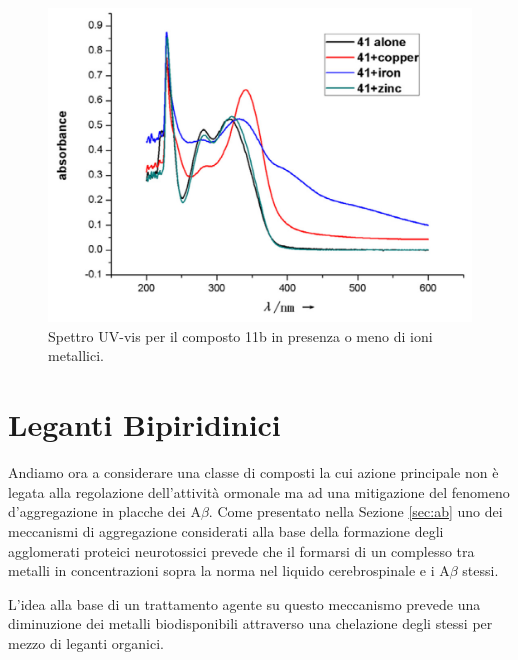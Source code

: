 \documentclass[a4paper, 12pt]{article}
\begin{document}
\begin{figure}[H]
	\centering
	\includegraphics[width=\linewidth]{immagini/metab_curcdone.png}
	\caption{Spettro UV-vis per il composto 11b in presenza o meno di ioni metallici.}
	\label{fig:metab_curcdone}
\end{figure}


\section{Leganti Bipiridinici}
\label{sec:byp}
Andiamo ora a considerare una classe di composti la cui azione principale non è legata alla regolazione dell'attività ormonale ma ad una mitigazione del fenomeno d'aggregazione in placche dei A\(\beta\). Come presentato nella Sezione \ref{sec:ab} uno dei meccanismi di aggregazione considerati alla base della formazione degli agglomerati proteici neurotossici prevede che il formarsi di un complesso tra metalli in concentrazioni sopra la norma nel liquido cerebrospinale e i A\(\beta\) stessi.

L'idea alla base di un trattamento agente su questo meccanismo prevede una diminuzione dei metalli biodisponibili attraverso una chelazione degli stessi per mezzo di leganti organici.
\end{document}
